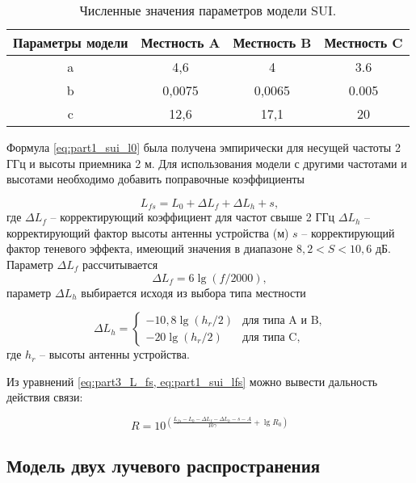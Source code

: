 \begin{longtable}[c]{| c | c | c | c |}
  \caption{Численные значения параметров модели SUI.}\label{tab:part1_abc_sui_model}\\

  \hline
  \textbf{Параметры модели} & \textbf{Местность A} & \textbf{Местность B} &  \textbf{Местность C}\\ \hline
  a & 4,6 & 4 & 3.6 \\
  b & 0,0075 & 0,0065 & 0.005 \\
  c & 12,6 & 17,1 &20 \\
  \hline
  \hline
\end{longtable}





Формула \cref{eq:part1_sui_l0} была получена эмпирически для несущей частоты 2 ГГц и высоты приемника 2 м. Для использования модели с другими частотами и высотами необходимо добавить поправочные коэффициенты 

\begin{equation}
  \label{eq:part1_sui_lfs}
  L_{fs} = L_0 + \Delta L_f + \Delta L_h + s,
\end{equation}
где $\Delta L_f$ -- корректирующий коэффициент для частот свыше 2 ГГц $\Delta L_h$ --  корректирующий фактор высоты антенны устройства (м) $s$ -- корректирующий фактор теневого эффекта, имеющий значения в диапазоне $8,2 < S < 10,6$ дБ. Параметр $\Delta L_f$ рассчитывается 
$$
\Delta L_f  = 6 \lg{(f / 2000)},
$$
параметр $\Delta L_h$ выбирается исходя из выбора типа местности

$$
\Delta L_h =  
 \begin{cases}
  -10,8 \lg{(h_r/2)} &\text{для типа A и B,}\\
  -20 \lg{(h_r/2)} &\text{для типа C,}
 \end{cases}
$$
где $h_r$ -- высоты антенны устройства.


Из уравнений \cref{eq:part3_L_fs, eq:part1_sui_lfs} можно вывести дальность действия связи:

\begin{equation}
  \label{eq:part1_sui_model_r}
  R = 10^{(\frac{L_{fs} - L_0 - \Delta L_f - \Delta L_h - s - A}{10\gamma} + \lg{R_0})}
\end{equation}

\subsection{Модель двух лучевого распространения}


